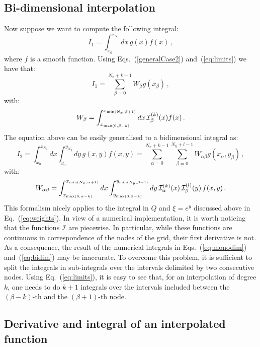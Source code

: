 \documentclass[10pt,a4paper]{article}
\begin{document}
\subsection{Bi-dimensional interpolation}

Now suppose we want to compute the following integral:
\begin{equation}
I_1 = \int_{x_0}^{x_{N_x}}dx\,g(x)f(x)\,,
\end{equation}
where $f$ is a smooth function. Using Eqs.~(\ref{generalCase2})
and~(\ref{eq:limits}) we have that:
\begin{equation}
  I_1 = \sum_{\beta=0}^{N_x+k-1} W_\beta g(x_{\beta})\,,
\end{equation}
with:
\begin{equation}\label{eq:monodim}
W_\beta = \int_{x_{{\rm max}(0,\beta-k)}}^{x_{{\rm min}(N_x,\beta+1)}}dx \,\mathcal{I}_\beta^{(k)}(x)f(x)\,.
\end{equation}
The equation above can be easily generalised to a bidimensional
integral as:
\begin{equation}
I_2 = \int_{x_0}^{x_{N_x}}dx \int_{y_0}^{y_{N_y}}dy\,g(x,y)f(x,y) = \sum_{\alpha=0}^{N_x+k-1} \sum_{\beta=0}^{N_y+l-1} W_{\alpha\beta} g(x_{\alpha},y_{\beta})\,,
\end{equation}
with:
\begin{equation}\label{eq:bidim}
W_{\alpha\beta} = \int_{x_{{\rm max}(0,\alpha-k)}}^{x_{{\rm
      min}(N_x,\alpha+1)}}dx \int_{y_{{\rm max}(0,\beta-k)}}^{y_{{\rm
      min}(N_y,\beta+1)}}dy \,\mathcal{I}_\alpha^{(k)}(x)\,\mathcal{I}_\beta^{(l)}(y)\,f(x,y)\,.
\end{equation}
This formalism nicely applies to the integral in $Q$ and $\xi=e^{y}$
discussed above in Eq.~(\ref{eq:weights}). In view of a numerical
implementation, it is worth noticing that the functions $\mathcal{I}$
are piecewise. In particular, while these functions are continuous in
correspondence of the nodes of the grid, their first derivative is
not. As a consequence, the result of the numerical integrals in
Eqs.~(\ref{eq:monodim}) and~(\ref{eq:bidim}) may be inaccurate. To
overcome this problem, it is sufficient to split the integrals in
sub-integrals over the intervals delimited by two consecutive
nodes. Using Eq.~(\ref{eq:limits}), it is easy to see that, for an
interpolation of degree $k$, one needs to do $k+1$ integrals over the
intervals included between the $(\beta-k)$-th and the $(\beta+1)$-th
node.

\subsection{Derivative and integral of an interpolated function}
\end{document}
